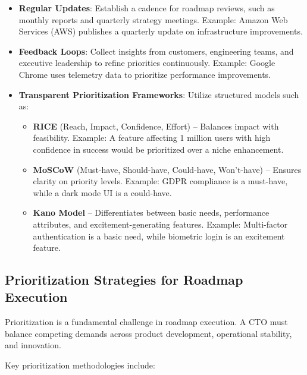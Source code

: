 \begin{itemize}
    \item \textbf{Regular Updates}: Establish a cadence for roadmap reviews, such as monthly reports and quarterly strategy meetings. Example: Amazon Web Services (AWS) publishes a quarterly update on infrastructure improvements.
    \item \textbf{Feedback Loops}: Collect insights from customers, engineering teams, and executive leadership to refine priorities continuously. Example: Google Chrome uses telemetry data to prioritize performance improvements.
    \item \textbf{Transparent Prioritization Frameworks}: Utilize structured models such as:
          \begin{itemize}
              \item \textbf{RICE} (Reach, Impact, Confidence, Effort) – Balances impact with feasibility. Example: A feature affecting 1 million users with high confidence in success would be prioritized over a niche enhancement.
              \item \textbf{MoSCoW} (Must-have, Should-have, Could-have, Won't-have) – Ensures clarity on priority levels. Example: GDPR compliance is a must-have, while a dark mode UI is a could-have.
              \item \textbf{Kano Model} – Differentiates between basic needs, performance attributes, and excitement-generating features. Example: Multi-factor authentication is a basic need, while biometric login is an excitement feature.
          \end{itemize}
\end{itemize}

\subsection{Prioritization Strategies for Roadmap Execution}
Prioritization is a fundamental challenge in roadmap execution. A CTO must balance competing demands across product development, operational stability, and innovation.

Key prioritization methodologies include:


